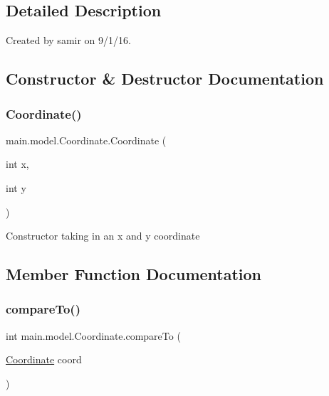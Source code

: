 \subsection{Detailed Description}
Created by samir on 9/1/16. 

\subsection{Constructor \& Destructor Documentation}
\hypertarget{classmain_1_1model_1_1_coordinate_adf838f26901635ae28525143e21c1263}{}\label{classmain_1_1model_1_1_coordinate_adf838f26901635ae28525143e21c1263} 
\subsubsection{\texorpdfstring{Coordinate()}{Coordinate()}}
{\footnotesize\ttfamily main.\+model.\+Coordinate.\+Coordinate (\begin{DoxyParamCaption}\item[{int}]{x,  }\item[{int}]{y }\end{DoxyParamCaption})}

Constructor taking in an x and y coordinate 

\subsection{Member Function Documentation}
\hypertarget{classmain_1_1model_1_1_coordinate_ae3d33c4d690428f5daadea5380cf801a}{}\label{classmain_1_1model_1_1_coordinate_ae3d33c4d690428f5daadea5380cf801a} 
\subsubsection{\texorpdfstring{compare\+To()}{compareTo()}}
{\footnotesize\ttfamily int main.\+model.\+Coordinate.\+compare\+To (\begin{DoxyParamCaption}\item[{\hyperlink{classmain_1_1model_1_1_coordinate}{Coordinate}}]{coord }\end{DoxyParamCaption})}

